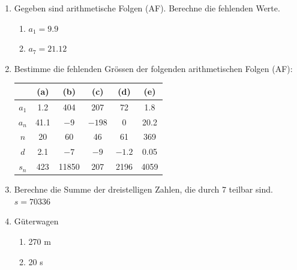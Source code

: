 \begin{enumerate}
    \item Gegeben sind arithmetische Folgen (AF). Berechne die fehlenden Werte.
    \begin{enumerate}
        \item[a)] $a_1 = 9.9$
        \item[b)] $a_7 = 21.12$
    \end{enumerate}
    
    \item Bestimme die fehlenden Grössen der folgenden arithmetischen Folgen (AF):
    

    \begin{center}
        \begin{tabular}{|c|c|c|c|c|c|}
        \hline
         & (a) & (b) & (c) & (d) & (e)  \\
        \hline
        $a_1$ & 1.2 & 404 & 207 & 72 & 1.8 \\
        \hline
        $a_n$ & 41.1 & $-$9& $-198$& 0& 20.2  \\
        \hline
        $n$ & 20 & 60& 46 &61&369 \\
        \hline
        $d$ & 2.1 & $-7$ &  $-9$ & $-1.2$ & 0.05  \\
        \hline
        $s_n$ & 423 & 11850 & 207 & 2196 & 4059  \\
        \hline
        \end{tabular}
        \end{center}
        
    
    \item Berechne die Summe der dreistelligen Zahlen, die durch 7 teilbar sind. $s = 70336$
    
    \item Güterwagen
    \begin{enumerate}
        \item 270 m
        \item 20 s
    \end{enumerate}
    
\end{enumerate}













